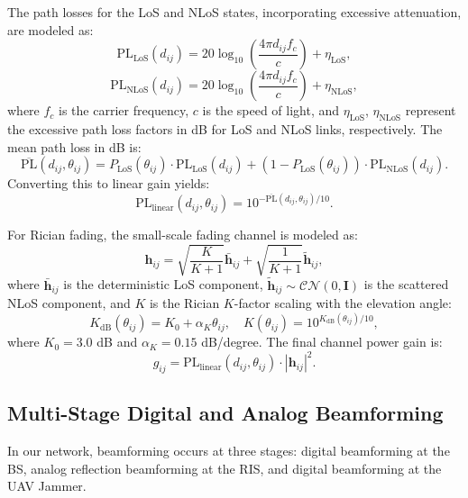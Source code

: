\documentclass[journal,onecolumn]{IEEEtran}
\begin{document}
The path losses for the LoS and NLoS states, incorporating excessive attenuation, are modeled as:
\begin{equation}
    \text{PL}_{\text{LoS}}(d_{ij}) = 20\log_{10}\left( \frac{4\pi d_{ij} f_c}{c} \right) + \eta_{\text{LoS}},
\end{equation}
\begin{equation}
    \text{PL}_{\text{NLoS}}(d_{ij}) = 20\log_{10}\left( \frac{4\pi d_{ij} f_c}{c} \right) + \eta_{\text{NLoS}},
\end{equation}
where $f_c$ is the carrier frequency, $c$ is the speed of light, and $\eta_{\text{LoS}}$, $\eta_{\text{NLoS}}$ represent the excessive path loss factors in dB for LoS and NLoS links, respectively. The mean path loss in dB is:
\begin{equation}
    \overline{\text{PL}}(d_{ij}, \theta_{ij}) = P_{\text{LoS}}(\theta_{ij}) \cdot \text{PL}_{\text{LoS}}(d_{ij}) + \left(1 - P_{\text{LoS}}(\theta_{ij})\right) \cdot \text{PL}_{\text{NLoS}}(d_{ij}).
\end{equation}
Converting this to linear gain yields:
\begin{equation}
    \text{PL}_{\text{linear}}(d_{ij}, \theta_{ij}) = 10^{-\overline{\text{PL}}(d_{ij}, \theta_{ij}) / 10}.
\end{equation}

For Rician fading, the small-scale fading channel is modeled as:
\begin{equation}
    \mathbf{h}_{ij} = \sqrt{\frac{K}{K+1}} \bar{\mathbf{h}}_{ij} + \sqrt{\frac{1}{K+1}} \tilde{\mathbf{h}}_{ij},
\end{equation}
where $\bar{\mathbf{h}}_{ij}$ is the deterministic LoS component, $\tilde{\mathbf{h}}_{ij} \sim \mathcal{CN}(0, \mathbf{I})$ is the scattered NLoS component, and $K$ is the Rician $K$-factor scaling with the elevation angle:
\begin{equation}
    K_{\text{dB}}(\theta_{ij}) = K_0 + \alpha_K \theta_{ij}, \quad K(\theta_{ij}) = 10^{K_{\text{dB}}(\theta_{ij}) / 10},
\end{equation}
where $K_0 = 3.0$ dB and $\alpha_K = 0.15$ dB/degree. The final channel power gain is:
\begin{equation}
    g_{ij} = \text{PL}_{\text{linear}}(d_{ij}, \theta_{ij}) \cdot |\mathbf{h}_{ij}|^2.
\end{equation}

\subsection{Multi-Stage Digital and Analog Beamforming}
In our network, beamforming occurs at three stages: digital beamforming at the BS, analog reflection beamforming at the RIS, and digital beamforming at the UAV Jammer.
\end{document}
